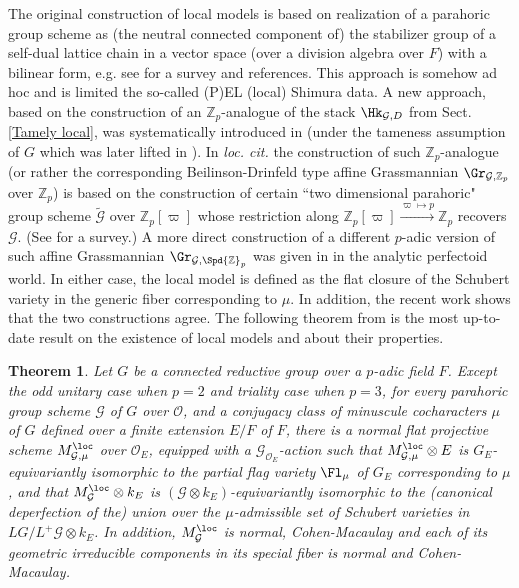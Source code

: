 \documentclass[11pt]{amsart}
\newtheorem{thm}{Theorem}[subsection]
\theoremstyle{definition}
\theoremstyle{definition}
\theoremstyle{definition}
\numberwithin{equation}{section}
\newcommand{\bZ}{{\mathbb Z}}
\newcommand{\mG}{{\mathcal G}}
\newcommand{\mO}{{\mathcal O}}
\begin{document}
The original construction of local models is based on realization of a parahoric group scheme as (the neutral connected component of) the stabilizer group of a self-dual lattice chain in a vector space (over a division algebra over $F$) with a bilinear form, e.g. see  \cite{PRS-Survey} for a survey and references. This approach is somehow ad hoc and is limited the so-called (P)EL (local) Shimura data. A new approach, based on the construction of an $\bZ_p$-analogue of the stack $\Hk_{\mG,D}$ from Sect. \ref{Tamely local}, was systematically introduced in \cite{Pappas-Zhu-Local-Model} (under the tameness assumption of $G$ which was later lifted in  \cite{Levin-Weil-Restriction, Lourenco}). In \emph{loc. cit.} the construction of such $\bZ_p$-analogue (or rather the corresponding Beilinson-Drinfeld type affine Grassmannian $\Gr_{\mG,\bZ_p}$ over $\bZ_p$) is based on the construction of certain ``two dimensional parahoric" group scheme $\widetilde\mG$ over $\bZ_p[\varpi]$ whose restriction along $\bZ_p[\varpi]\xrightarrow{\varpi\mapsto p}\bZ_p$ recovers $\mG$. (See \cite{Zhu-ICCM} for a survey.)
A more direct construction of a different $p$-adic version of such affine Grassmannian $\Gr_{\mG,\Spd\bZ_p}$ was given in \cite{Scholze-Berkeley} in the analytic perfectoid world. In either case, the local model is defined as the flat closure of the Schubert variety  in the generic fiber corresponding to $\mu$. In addition, the recent work \cite{AGLR} shows that the two constructions agree.
The following theorem from  \cite{AGLR} is the most up-to-date result on the existence of local models and about their properties.
\begin{thm}
Let  $G$ be a connected reductive group over a $p$-adic field $F$. Except the odd unitary case when $p=2$ and triality case when $p=3$,
for every parahoric group scheme $\mG$ of $G$ over $\mO$, and a conjugacy class of minuscule cocharacters $\mu$ of $G$ defined over a finite extension $E/F$ of $F$,
there is a normal flat projective scheme $M_{\mG,\mu}^{\loc}$ over $\mO_E$, equipped with a $\mG_{\mO_E}$-action such that $M_{\mG,\mu}^{\loc}\otimes E$ is $G_E$-equivariantly isomorphic to the partial flag variety $\Fl_{\mu}$ of $G_E$ corresponding to $\mu$, and that $M_{\mG}^{\loc}\otimes k_E$ is $(\mG\otimes k_E)$-equivariantly isomorphic to the (canonical deperfection of the) union over the $\mu$-admissible set of Schubert varieties in $LG/L^+\mG\otimes k_E$. In addition, $M_{\mG}^{\loc}$ is
normal, Cohen-Macaulay and  each of its geometric irreducible components in its special fiber  is normal and Cohen-Macaulay. 
\end{thm}
\end{document}
